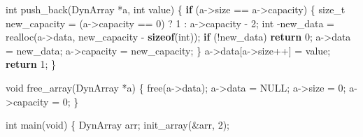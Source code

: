 \documentclass[
  letterpaper,
  DIV=11,
  numbers=noendperiod]{scrreprt}
\newenvironment{Shaded}{\begin{snugshade}}{\end{snugshade}}
\newcommand{\ControlFlowTok}[1]{\textcolor[rgb]{0.00,0.23,0.31}{\textbf{#1}}}
\newcommand{\DataTypeTok}[1]{\textcolor[rgb]{0.68,0.00,0.00}{#1}}
\newcommand{\DecValTok}[1]{\textcolor[rgb]{0.68,0.00,0.00}{#1}}
\newcommand{\KeywordTok}[1]{\textcolor[rgb]{0.00,0.23,0.31}{\textbf{#1}}}
\newcommand{\NormalTok}[1]{\textcolor[rgb]{0.00,0.23,0.31}{#1}}
\newcommand{\OperatorTok}[1]{\textcolor[rgb]{0.37,0.37,0.37}{#1}}
\begin{document}
\begin{Shaded}
\begin{Highlighting}[]
\DataTypeTok{int}\NormalTok{ push\_back}\OperatorTok{(}\NormalTok{DynArray }\OperatorTok{*}\NormalTok{a}\OperatorTok{,} \DataTypeTok{int}\NormalTok{ value}\OperatorTok{)} \OperatorTok{\{}
    \ControlFlowTok{if} \OperatorTok{(}\NormalTok{a}\OperatorTok{{-}\textgreater{}}\NormalTok{size }\OperatorTok{==}\NormalTok{ a}\OperatorTok{{-}\textgreater{}}\NormalTok{capacity}\OperatorTok{)} \OperatorTok{\{}
        \DataTypeTok{size\_t}\NormalTok{ new\_capacity }\OperatorTok{=} \OperatorTok{(}\NormalTok{a}\OperatorTok{{-}\textgreater{}}\NormalTok{capacity }\OperatorTok{==} \DecValTok{0}\OperatorTok{)} \OperatorTok{?} \DecValTok{1} \OperatorTok{:}\NormalTok{ a}\OperatorTok{{-}\textgreater{}}\NormalTok{capacity }\OperatorTok{{-}} \DecValTok{2}\OperatorTok{;}
        \DataTypeTok{int} \OperatorTok{{-}}\NormalTok{new\_data }\OperatorTok{=}\NormalTok{ realloc}\OperatorTok{(}\NormalTok{a}\OperatorTok{{-}\textgreater{}}\NormalTok{data}\OperatorTok{,}\NormalTok{ new\_capacity }\OperatorTok{{-}} \KeywordTok{sizeof}\OperatorTok{(}\DataTypeTok{int}\OperatorTok{));}
        \ControlFlowTok{if} \OperatorTok{(!}\NormalTok{new\_data}\OperatorTok{)} \ControlFlowTok{return} \DecValTok{0}\OperatorTok{;}
\NormalTok{        a}\OperatorTok{{-}\textgreater{}}\NormalTok{data }\OperatorTok{=}\NormalTok{ new\_data}\OperatorTok{;}
\NormalTok{        a}\OperatorTok{{-}\textgreater{}}\NormalTok{capacity }\OperatorTok{=}\NormalTok{ new\_capacity}\OperatorTok{;}
    \OperatorTok{\}}
\NormalTok{    a}\OperatorTok{{-}\textgreater{}}\NormalTok{data}\OperatorTok{[}\NormalTok{a}\OperatorTok{{-}\textgreater{}}\NormalTok{size}\OperatorTok{++]} \OperatorTok{=}\NormalTok{ value}\OperatorTok{;}
    \ControlFlowTok{return} \DecValTok{1}\OperatorTok{;}
\OperatorTok{\}}

\DataTypeTok{void}\NormalTok{ free\_array}\OperatorTok{(}\NormalTok{DynArray }\OperatorTok{*}\NormalTok{a}\OperatorTok{)} \OperatorTok{\{}
\NormalTok{    free}\OperatorTok{(}\NormalTok{a}\OperatorTok{{-}\textgreater{}}\NormalTok{data}\OperatorTok{);}
\NormalTok{    a}\OperatorTok{{-}\textgreater{}}\NormalTok{data }\OperatorTok{=}\NormalTok{ NULL}\OperatorTok{;}
\NormalTok{    a}\OperatorTok{{-}\textgreater{}}\NormalTok{size }\OperatorTok{=} \DecValTok{0}\OperatorTok{;}
\NormalTok{    a}\OperatorTok{{-}\textgreater{}}\NormalTok{capacity }\OperatorTok{=} \DecValTok{0}\OperatorTok{;}
\OperatorTok{\}}

\DataTypeTok{int}\NormalTok{ main}\OperatorTok{(}\DataTypeTok{void}\OperatorTok{)} \OperatorTok{\{}
\NormalTok{    DynArray arr}\OperatorTok{;}
\NormalTok{    init\_array}\OperatorTok{(\&}\NormalTok{arr}\OperatorTok{,} \DecValTok{2}\OperatorTok{);}


\end{Highlighting}
\end{Shaded}
\end{document}
